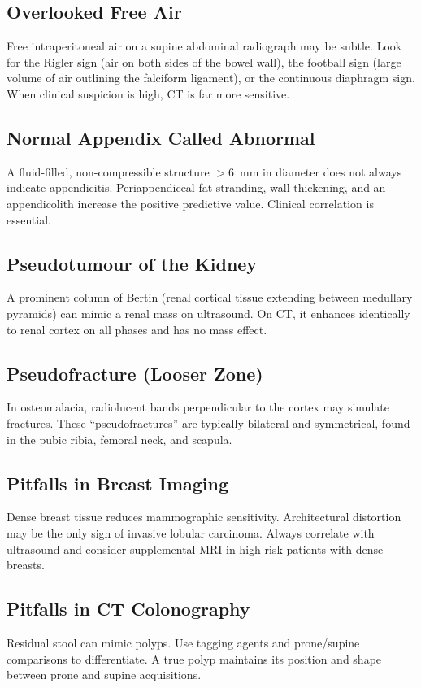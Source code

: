 \subsection{Overlooked Free Air}
Free intraperitoneal air on a supine abdominal radiograph may be subtle. Look for the Rigler sign (air on both sides of the bowel wall), the football sign (large volume of air outlining the falciform ligament), or the continuous diaphragm sign. When clinical suspicion is high, CT is far more sensitive.

\subsection{Normal Appendix Called Abnormal}
A fluid-filled, non-compressible structure $>6$~mm in diameter does not always indicate appendicitis. Periappendiceal fat stranding, wall thickening, and an appendicolith increase the positive predictive value. Clinical correlation is essential.

\subsection{Pseudotumour of the Kidney}
A prominent column of Bertin (renal cortical tissue extending between medullary pyramids) can mimic a renal mass on ultrasound. On CT, it enhances identically to renal cortex on all phases and has no mass effect.

\subsection{Pseudofracture (Looser Zone)}
In osteomalacia, radiolucent bands perpendicular to the cortex may simulate fractures. These ``pseudofractures'' are typically bilateral and symmetrical, found in the pubic ribia, femoral neck, and scapula.

\subsection{Pitfalls in Breast Imaging}
Dense breast tissue reduces mammographic sensitivity. Architectural distortion may be the only sign of invasive lobular carcinoma. Always correlate with ultrasound and consider supplemental MRI in high-risk patients with dense breasts.

\subsection{Pitfalls in CT Colonography}
Residual stool can mimic polyps. Use tagging agents and prone/supine comparisons to differentiate. A true polyp maintains its position and shape between prone and supine acquisitions.

